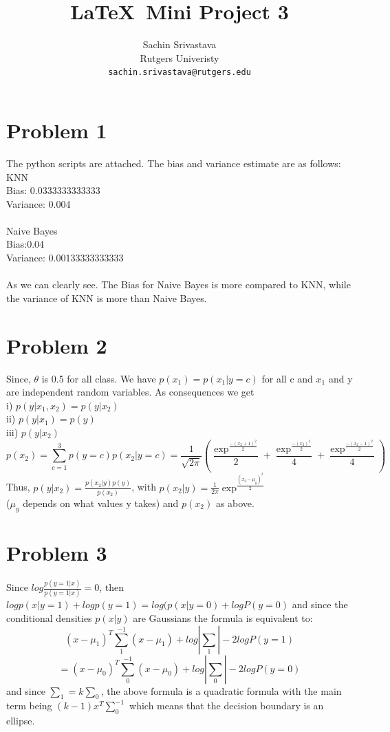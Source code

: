 \documentclass[10pt,onecolumn,letterpaper]{article}
\begin{document}
\title{\LaTeX\ Mini Project 3}

\author{Sachin Srivastava\\
Rutgers Univeristy\\
{\tt\small sachin.srivastava@rutgers.edu}
}


\maketitle


\section{Problem 1}
The python scripts are attached. The bias and variance estimate are as follows:\\
KNN\\
Bias: 0.0333333333333\\
Variance: 0.004\\
\\
Naive Bayes\\
Bias:0.04\\
Variance: 0.00133333333333\\
\\
As we can clearly see. The Bias for Naive Bayes is more compared to KNN, while the variance of KNN is more than Naive Bayes.
\section{Problem 2}
Since, $\theta$ is 0.5 for all class. We have $p(x_1)=p(x_1|y=c)$ for all c and $x_1$ and y are independent random variables. As consequences we get\\
i)   $p(y|x_1,x_2) = p(y|x_2)$\\
ii)  $p(y|x_1) = p(y)$\\
iii) $p(y|x_2)$\\
$$
p(x_2) = \sum_{c=1}^3 p(y=c)p(x_2|y=c)
=\frac{1}{\sqrt{2\pi}}(\frac{\exp^\frac{-(x_2+1)^2}{2}}{2} + \frac{\exp^\frac{-(x_2)^2}{2}}{4} + \frac{\exp^\frac{-(x_2-1)^2}{2}}{4} )
$$
Thus, $p(y|x_2)=\frac{p(x_2|y)p(y)}{p(x_2)}$, with $p(x_2|y) = \frac{1}{2\pi}\exp^\frac{(x_2-\mu_y)^2}{2}$\\
($\mu_y$ depends on what values y takes) and $p(x_2)$ as above.


\section{Problem 3}
Since $log \frac{p(y=1|x)}{p(y=1|x)} =0$, then $log p(x|y = 1) + log p(y = 1) = log(p(x|y = 0) + log P(y = 0)$ and since the conditional densities $p(x|y)$ are Gaussians the formula is equivalent to:\\
$$
(x - \mu_1)^T\sum_1^{-1}(x-\mu_1)+ log |\sum_1| - 2 log P(y = 1) $$
$$
= (x - \mu_0)^T\sum_0^{-1}(x - \mu_0) + log |\sum_0| - 2 log P(y = 0)
$$
and since $\sum_1 = k\sum_0$, the above formula is a quadratic formula with the main term being $(k -1)x^T\sum_0^{-1}$ which means that the decision boundary is an ellipse.
\end{document}
